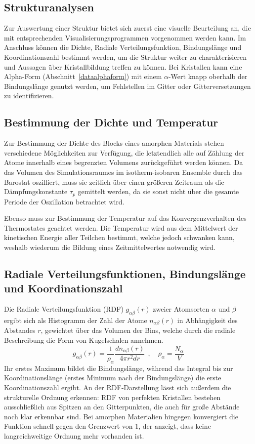 \subsection{Strukturanalysen}

Zur Auswertung einer Struktur bietet sich zuerst eine visuelle Beurteilung an, die mit entsprechenden Visualisierungsprogrammen vorgenommen werden kann.
Im Anschluss können die Dichte, Radiale Verteilungsfunktion, Bindungslänge und Koordinationszahl bestimmt werden, um die Struktur weiter zu charakterisieren und Aussagen über Kristallbildung treffen zu können.
Bei Kristallen kann eine Alpha-Form (Abschnitt~\ref{dataalphaform}) mit einem $\alpha$-Wert knapp oberhalb der Bindungslänge genutzt werden, um Fehlstellen im Gitter oder Gitterversetzungen zu identifizieren.

\subsection{Bestimmung der Dichte und Temperatur}

Zur Bestimmung der Dichte des Blocks eines amorphen Materials stehen verschiedene Möglichkeiten zur Verfügung, die letztendlich alle auf Zählung der Atome innerhalb eines begrenzten Volumens zurückgeführt werden können.
Da das Volumen des Simulationsraumes im isotherm-isobaren Ensemble durch das Barostat oszilliert, muss sie zeitlich über einen größeren Zeitraum als die Dämpfungskonstante $\tau_p$ gemittelt werden, da sie sonst nicht über die gesamte Periode der Oszillation betrachtet wird.

Ebenso muss zur Bestimmung der Temperatur auf das Konvergenzverhalten des Thermostates geachtet werden.
Die Temperatur wird aus dem Mittelwert der kinetischen Energie aller Teilchen bestimmt, welche jedoch schwanken kann, weshalb wiederum die Bildung eines Zeitmittelwertes notwendig wird.

\subsection{Radiale Verteilungsfunktionen, Bindungslänge und Koordinationszahl}

Die Radiale Verteilungsfunktion (RDF) $g_{\alpha\beta}(r)$ zweier Atomsorten $\alpha$ und $\beta$ ergibt sich als Histogramm der Zahl der Atome $n_{\alpha\beta}(r)$ in Abhängigkeit des Abstandes $r$, gewichtet über das Volumen der Bins, welche durch die radiale Beschreibung die Form von Kugelschalen annehmen.
\begin{equation}
  g_{\alpha\beta}(r) = \frac{1}{\rho_\alpha} \frac{d n_{\alpha\beta}(r)}{4 \pi r^2 dr} ~~,\quad \rho_\alpha = \frac{N_\alpha}{V}
\end{equation}
Ihr erstes Maximum bildet die Bindungslänge, während das Integral bis zur Koordinationslänge (erstes Minimum nach der Bindungslänge) die erste Koordinationszahl ergibt.
An der RDF-Darstellung lässt sich außerdem die strukturelle Ordnung erkennen:
RDF von perfekten Kristallen bestehen ausschließlich aus Spitzen an den Gitterpunkten, die auch für große Abstände noch klar erkennbar sind.
Bei amorphen Materialien hingegen konvergiert die Funktion schnell gegen den Grenzwert von 1, der anzeigt, dass keine langreichweitige Ordnung mehr vorhanden ist.

